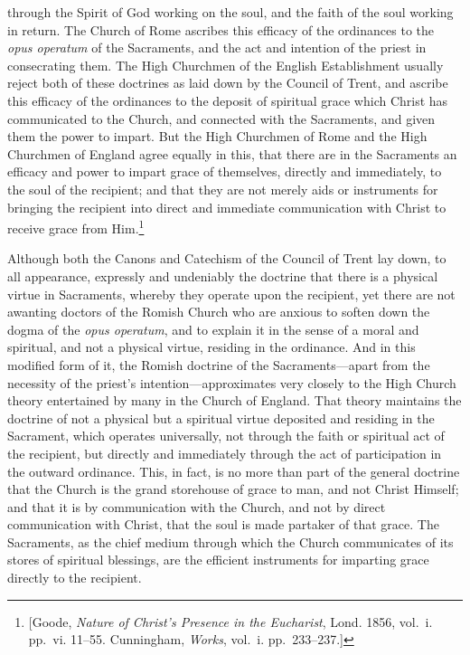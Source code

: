 \documentclass[
  english,
]{book}
\providecommand{\textlatin}{}
\renewcommand{\textlatin}[2][]{\foreignlanguage{latin}{#2}}
\begin{document}
through the Spirit of God working on the soul, and the faith of the soul working in return. The Church of Rome ascribes this efficacy of the ordinances to the \textlatin{\emph{opus operatum}} of the Sacraments, and the act and intention of the priest in consecrating them. The High Churchmen of the English Establishment usually reject both of these doctrines as laid down by the Council of Trent, and ascribe this efficacy of the ordinances to the deposit of spiritual grace which Christ has communicated to the Church, and connected with the Sacraments, and given them the power to impart. But the High Churchmen of Rome and the High Churchmen of England agree equally in this, that there are in the Sacraments an efficacy and power to impart grace of themselves, directly and immediately, to the soul of the recipient; and that they are not merely aids or instruments for bringing the recipient into direct and immediate communication with Christ to receive grace from Him.\footnote{{[}Goode, \emph{Nature of Christ's Presence in the Eucharist}, Lond. 1856, vol.~i. pp.~vi. 11--55. Cunningham, \emph{Works}, vol.~i. pp.~233--237.{]}}

Although both the Canons and Catechism of the Council of Trent lay down, to all appearance, expressly and undeniably the doctrine that there is a physical virtue in Sacraments, whereby they operate upon the recipient, yet there are not awanting doctors of the Romish Church who are anxious to soften down the dogma of the \textlatin{\emph{opus operatum}}, and to explain it in the sense of a moral and spiritual, and not a physical virtue, residing in the ordinance. And in this modified form of it, the Romish doctrine of the Sacraments---apart from the necessity of the priest's intention---approximates very closely to the High Church theory entertained by many in the Church of England. That theory maintains the doctrine of not a physical but a spiritual virtue deposited and residing in the Sacrament, which operates universally, not through the faith or spiritual act of the recipient, but directly and immediately through the act of participation in the outward ordinance. This, in fact, is no more than part of the general doctrine that the Church is the grand storehouse of grace to man, and not Christ Himself; and that it is by communication with the Church, and not by direct communication with Christ, that the soul is made partaker of that grace. The Sacraments, as the chief medium through which the Church communicates of its stores of spiritual blessings, are the efficient instruments for imparting grace directly to the recipient.
\end{document}
